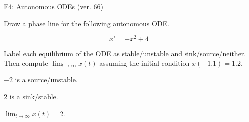 \begin{exercise}
  \begin{exerciseTitle}F4: Autonomous ODEs (ver. 66)\end{exerciseTitle}
  \begin{exerciseStatement}
    

      Draw a phase line for the following 
      autonomous ODE.
    

    
\[x'= -x^{2} + 4\]

    

      Label each equilibrium of the ODE
      as stable/unstable and sink/source/neither.
      Then compute \(\lim_{t\to\infty}x(t)\)
      assuming the initial condition
      \(x( -1.1 )= 1.2\).
    

  \end{exerciseStatement}
  \begin{exerciseAnswer}
    

      \(-2\) is a source/unstable.
      
      \(2\) is a sink/stable.
    

    

      \(\lim_{t\to\infty}x(t)=2\).
    

  \end{exerciseAnswer}
\end{exercise}